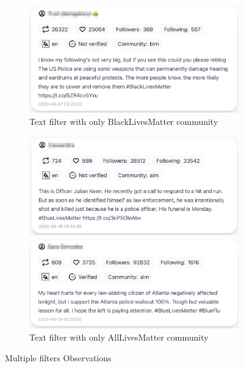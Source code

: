 \begin{figure}[H]
\begin{subfigure}{.5\textwidth}
  \includegraphics[width=1\linewidth]{Report-latex/tex_files/pics/example/obserpb2.png}
  \caption{Text filter with only BlackLivesMatter community}
  \label{fig:sub-second}
\end{subfigure}

\begin{subfigure}{.5\textwidth}
  \centering
  \captionsetup{justification=centering}
  \includegraphics[width=1\linewidth]{Report-latex/tex_files/pics/example/obserpa1.png}
  
  
  \includegraphics[width=1\linewidth]{Report-latex/tex_files/pics/example/obserpa2.png}
  \caption{Text filter with only AllLivesMatter community}
  \label{fig:sub-second}
\end{subfigure}

\captionsetup{justification=centering}
\caption{Multiple filters Observations}
\label{fig:e-m-f-obs}
\end{figure}


